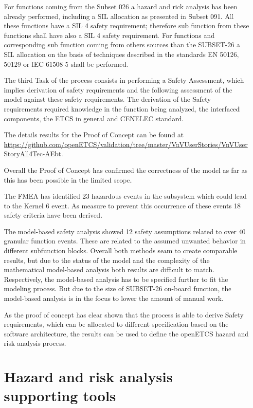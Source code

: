 \documentclass{template/openetcs_report}
\begin{document}
For functions coming from the Subset 026 a hazard and rick analysis has been already performed, including a SIL allocation as presented in Subset 091. All these functions have a SIL 4 safety requirement; therefore sub function from these functions shall have also a SIL 4 safety requirement. For functions and corresponding sub function coming from others sources than the SUBSET-26 a SIL allocation on the basis of techniques described in the standards EN 50126, 50129 or IEC 61508-5 shall be performed.
 
The third Task of the process consists in performing a Safety Assessment, which implies derivation of safety requirements and the following assessment of the model against these safety requirements. The derivation of the Safety requirements required knowledge in the function being analyzed, the interfaced components, the ETCS in general and CENELEC standard.
 
 
The details results for the Proof of Concept can be found at \url{https://github.com/openETCS/validation/tree/master/VnVUserStories/VnVUserStoryAll4Tec-AEbt}. 

Overall the Proof of Concept has confirmed the correctness of the model as far as this has been possible in the limited scope. 

The FMEA has identified 23 hazardous events in the subsystem which could lead to the Kernel 6 event. As measure to prevent this occurrence of these events 18 safety criteria have been derived.  

The model-based safety analysis showed 12 safety assumptions related to over 40 granular function events. These are related to the assumed unwanted behavior in different subfunction blocks. Overall both methods seam to create comparable results, but due to the status of the model and the complexity of the mathematical model-based analysis both results are difficult to match. Respectively, the model-based analysis has to be specified further to fit the modeling process. But due to the size of SUBSET-26 on-board function, the model-based analysis is in the focus to lower the amount of manual work.
 
As the proof of concept has clear shown that the process is able to derive Safety requirements, which can be allocated to different specification based on the software architecture, the results can be used to define the openETCS hazard and risk analysis process.
 
\section{Hazard and risk analysis supporting tools}
\end{document}
